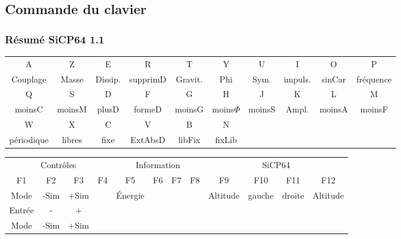 \subsection{Commande du clavier}

\subsubsection{Résumé SiCP64 1.1}
\begin{center}
\begin{tabular}{cccccccccc}
\sf A &\sf Z &\sf E &\sf R &\sf T &\sf Y &\sf U &\sf I &\sf O &\sf P \\
Couplage & Masse & Dissip. & supprimD & Gravit. & Phi & Sym. & impuls. & sinCar & fréquence \\
\sf Q &\sf S &\sf D &\sf F &\sf G &\sf H &\sf J &\sf K &\sf L &\sf M \\
moinsC & moinsM & plusD & formeD & moinsG & moins$\Phi$ & moinsS & Ampl. & moinsA & moinsF \\
\sf W &\sf X &\sf C &\sf V &\sf B &\sf N &  &  &  & \\
périodique & libres & fixe & ExtAbsD & libFix & fixLib &  &  &  & \\
\end{tabular}
\end{center}
\vspace{.3cm}
\begin{center}
\begin{tabular}{ccccc ccccc cc}
\multicolumn{4}{|c|}{Contrôles} & \multicolumn{4}{c}{Information} & \multicolumn{4}{|c|}{SiCP64}\\
\sf F1 &\sf F2 &\sf F3 &\sf F4 &\sf F5 &\sf F6 &\sf F7 &\sf F8 &\sf F9 &\sf F10 &\sf F11 &\sf F12 \\
Mode & -Sim & +Sim &  & Énergie  &  &  &   & Altitude & gauche & droite & Altitude \\
\sf Entrée &\sf - &\sf + &\sf  &\sf  &\sf  &\sf  &\sf  &\sf  &\sf  \\
Mode & -Sim & +Sim & & & & & & & \\
\end{tabular}
\end{center}
